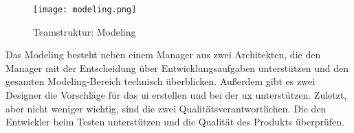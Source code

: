 \begin{figure}[ht]
	\centering
	\texttt{[image: modeling.png]}
	\caption{Teamstruktur: Modeling}
	\label{img:sac-modeling}
\end{figure}

Das Modeling besteht neben einem Manager aus zwei Architekten, die den Manager mit der Entscheidung über 
Entwicklungsaufgaben unterstützen und den gesamten Modeling-Bereich technisch überblicken. Außerdem gibt es zwei Designer 
die Vorschläge für das \ac{ui} erstellen und bei der \ac{ux} unterstützen. Zuletzt, aber nicht weniger wichtig, sind die zwei Qualitätsverantwortlichen. 
Die den Entwickler beim Testen unterstützen und die Qualität des Produkts überprüfen. 